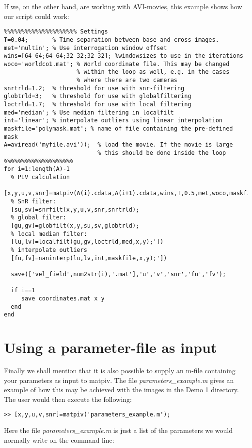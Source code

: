 \documentclass{book}
\begin{document}
If we, on the other hand, are working with AVI-movies, this example
shows how our script could work:
\begin{verbatim}
%%%%%%%%%%%%%%%%%%%%% Settings
T=0.04;       % Time separation between base and cross images.
met='multin'; % Use interrogation window offset
wins=[64 64;64 64;32 32;32 32]; %windowsizes to use in the iterations
woco='worldco1.mat'; % World coordinate file. This may be changed
                     % within the loop as well, e.g. in the cases 
                     % where there are two cameras
snrtrld=1.2;  % threshold for use with snr-filtering
globtrld=3;   % threshold for use with globalfiltering
loctrld=1.7;  % threshold for use with local filtering
med='median'; % Use median filtering in localfilt
int='linear'; % interpolate outliers using linear interpolation
maskfile='polymask.mat'; % name of file containing the pre-defined mask
A=aviread('myfile.avi'));  % load the movie. If the movie is large
                           % this should be done inside the loop
%%%%%%%%%%%%%%%%%%%%
for i=1:length(A)-1
  % PIV calculation
  [x,y,u,v,snr]=matpiv(A(i).cdata,A(i+1).cdata,wins,T,0.5,met,woco,maskfile);'])
  % SnR filter:
  [su,sv]=snrfilt(x,y,u,v,snr,snrtrld);
  % global filter:
  [gu,gv]=globfilt(x,y,su,sv,globtrld);
  % local median filter:
  [lu,lv]=localfilt(gu,gv,loctrld,med,x,y);'])
  % interpolate outliers
  [fu,fv]=naninterp(lu,lv,int,maskfile,x,y);'])

  save(['vel_field',num2str(i),'.mat'],'u','v','snr','fu','fv');

  if i==1
     save coordinates.mat x y
  end
end
\end{verbatim}

\section{Using a parameter-file as input}

Finally we shall mention that it is also possible to supply an m-file
containing your parameters as input to matpiv. The file {\em
parameters\_example.m} gives an example of how this may be achieved with
the images in the Demo 1 directory. The user would then execute the
following:
\begin{verbatim}
>> [x,y,u,v,snr]=matpiv('parameters_example.m');
\end{verbatim}

Here the file {\em parameters\_example.m} is just a list of the
parameters we would normally write on the command line:
\end{document}
